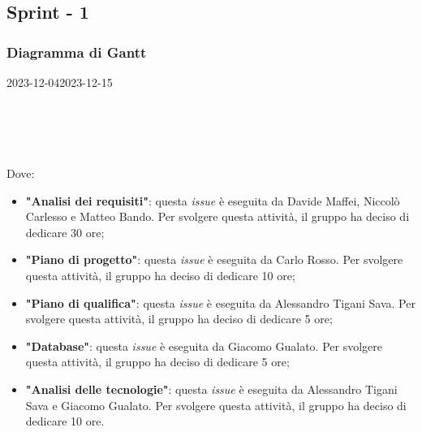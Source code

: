\subsection{Sprint - 1}

\subsubsection{Diagramma di Gantt}

\begin{ganttchart}[
		x unit=0.6cm, %
		y unit chart=0.6cm,
		bar/.style={fill=blue!50},
		bar height=0.5,
		time slot format=isodate,
		time slot unit=day,
		vgrid,
		today=2023-12-04,
		today rule/.style={draw=red, ultra thick}
	]{2023-12-04}{2023-12-15}
	 \\
	 \\
	 \\
	 \\
	 \\
\end{ganttchart}

Dove:
\begin{itemize}
	\item \textbf{"Analisi dei requisiti"}: questa \textit{issue} è eseguita da
	      Davide Maffei, Niccolò Carlesso e Matteo Bando. Per
	      svolgere questa attività, il gruppo ha deciso di dedicare 30 ore;

	\item \textbf{"Piano di progetto"}: questa \textit{issue} è eseguita da
	      Carlo Rosso. Per svolgere questa attività, il gruppo ha deciso
	      di dedicare 10 ore;

	\item \textbf{"Piano di qualifica"}: questa \textit{issue} è eseguita da
	      Alessandro Tigani Sava. Per svolgere questa attività, il gruppo ha
	      deciso di dedicare 5 ore;

	\item \textbf{"Database"}: questa \textit{issue} è eseguita da Giacomo
	      Gualato. Per svolgere questa attività, il gruppo ha deciso di
	      dedicare 5 ore;

	\item \textbf{"Analisi delle tecnologie"}: questa \textit{issue} è eseguita
	      da Alessandro Tigani Sava e Giacomo Gualato. Per svolgere questa
	      attività, il gruppo ha deciso di dedicare 10 ore.
\end{itemize}


